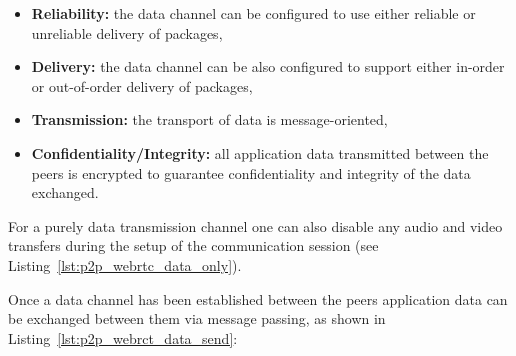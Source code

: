 \begin{itemize}
		\item \textbf{Reliability:} the data channel can be configured to use either reliable or unreliable delivery of packages,
		\item \textbf{Delivery:} the data channel can be also configured to support either in-order or out-of-order delivery of packages,
		\item \textbf{Transmission:} the transport of data is message-oriented,
		\item \textbf{Confidentiality/Integrity:} all application data transmitted between the peers is encrypted to guarantee confidentiality and integrity of the data exchanged.
\end{itemize}

For a purely data transmission channel one can also disable any audio and video transfers during the setup of the communication session (see Listing~\ref{lst:p2p_webrtc_data_only}). \@


Once a data channel has been established between the peers application data can be exchanged between them via message passing, as shown in Listing~\ref{lst:p2p_webrct_data_send}: \@




